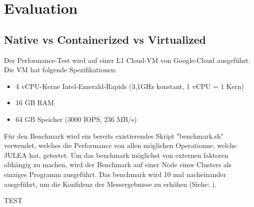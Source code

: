 \chapter{Evaluation}

\section{Native vs Containerized vs Virtualized}

Der Performance-Test wird auf einer L1 Cloud-VM von Google-Cloud ausgeführt. 
Die VM hat folgende Spezifikationen:

\begin{itemize}
    \item 4 vCPU-Kerne Intel-Emerald-Rapids (3,1GHz konstant, 1 vCPU = 1 Kern)
    \item 16 GB RAM
    \item 64 GB Speicher (3000 IOPS, 236 MB/s)
\end{itemize}

Für den Benchmark wird ein bereits existierendes Skript "benchmark.sh" verwendet, welches die Performance von allen möglichen Operationne, welche JULEA hat, getestet. Um das benchmark möglichst von externen faktoren abhängig zu machen, wird der Benchmark auf einer Node eines Clusters als einziges Programm ausgeführt. Das benchmark wird 10 mal nacheinander ausgeführt, um die Konfidenz der Messergebnisse zu erhöhen (Siehe: \cite{kaliberaRigorousBenchmarkingReasonable2013}).   


TEST

